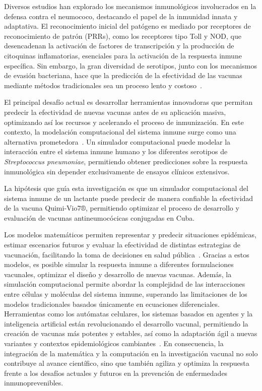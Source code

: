 Diversos estudios han explorado los mecanismos inmunológicos involucrados en la defensa contra el neumococo, destacando el papel de la inmunidad innata y adaptativa. El reconocimiento inicial del patógeno es mediado por receptores de reconocimiento de patrón (PRRs), como los receptores tipo Toll y NOD, que desencadenan la activación de factores de transcripción y la producción de citoquinas inflamatorias, esenciales para la activación de la respuesta inmune específica. Sin embargo, la gran diversidad de serotipos, junto con los mecanismos de evasión bacteriana, hace que la predicción de la efectividad de las vacunas mediante métodos tradicionales sea un proceso lento y costoso~\cite{Janeway2002}.

El principal desafío actual es desarrollar herramientas innovadoras que permitan predecir la efectividad de nuevas vacunas antes de su aplicación masiva, optimizando así los recursos y acelerando el proceso de inmunización. En este contexto, la modelación computacional del sistema inmune surge como una alternativa prometedora~\cite{Castiglione2014}. Un simulador computacional puede modelar la interacción entre el sistema inmune humano y los diferentes serotipos de \textit{Streptococcus pneumoniae}, permitiendo obtener predicciones sobre la respuesta inmunológica sin depender exclusivamente de ensayos clínicos extensivos.


La hipótesis que guía esta investigación es que un simulador computacional del sistema inmune de un lactante puede predecir de manera confiable la efectividad de la vacuna Quimi-Vio7®, permitiendo optimizar el proceso de desarrollo y evaluación de vacunas antineumocócicas conjugadas en Cuba.


Los modelos matemáticos permiten representar y predecir situaciones epidémicas, estimar escenarios futuros y evaluar la efectividad de distintas estrategias de vacunación, facilitando la toma de decisiones en salud pública~\cite{SINC2021,UC3M2022}. Gracias a estos modelos, es posible simular la respuesta inmune a diferentes formulaciones vacunales, optimizar el diseño y desarrollo de nuevas vacunas. Además, la simulación computacional permite abordar la complejidad de las interacciones entre células y moléculas del sistema inmune, superando las limitaciones de los modelos tradicionales basados únicamente en ecuaciones diferenciales. Herramientas como los autómatas celulares, los sistemas basados en agentes y la inteligencia artificial están revolucionando el desarrollo vacunal, permitiendo la creación de vacunas más potentes y estables, así como la adaptación ágil a nuevas variantes y contextos epidemiológicos cambiantes~\cite{DW2023}. En consecuencia, la integración de la matemática y la computación en la investigación vacunal no solo contribuye al avance científico, sino que también agiliza y optimiza la respuesta frente a los desafíos actuales y futuros en la prevención de enfermedades inmunoprevenibles.

